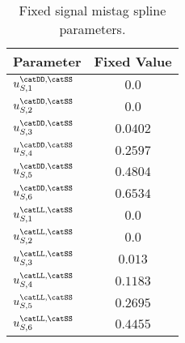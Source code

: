 \begin{table}[htb]
\caption{Fixed signal \SSpi mistag spline parameters.}
\label{tab:app:measurement_of_sin2beta:cpv_measurement:fixed_parameters:eta:sig:ss}
\centering
\begin{tabular}{lr@{$\,\pm\,$}l}
  \toprule
  Parameter                      & \multicolumn{2}{c}{Fixed Value} \\
  \midrule
  $u_{S,1}^\text{\catDD,\catSS}$ & \multicolumn{2}{c}{$0.0$}\\
  $u_{S,2}^\text{\catDD,\catSS}$ & \multicolumn{2}{c}{$0.0$}\\
  $u_{S,3}^\text{\catDD,\catSS}$ & \multicolumn{2}{c}{$0.0402$}\\
  $u_{S,4}^\text{\catDD,\catSS}$ & \multicolumn{2}{c}{$0.2597$}\\
  $u_{S,5}^\text{\catDD,\catSS}$ & \multicolumn{2}{c}{$0.4804$}\\
  $u_{S,6}^\text{\catDD,\catSS}$ & \multicolumn{2}{c}{$0.6534$}\\
  $u_{S,1}^\text{\catLL,\catSS}$ & \multicolumn{2}{c}{$0.0$}\\
  $u_{S,2}^\text{\catLL,\catSS}$ & \multicolumn{2}{c}{$0.0$}\\
  $u_{S,3}^\text{\catLL,\catSS}$ & \multicolumn{2}{c}{$0.013$}\\
  $u_{S,4}^\text{\catLL,\catSS}$ & \multicolumn{2}{c}{$0.1183$}\\
  $u_{S,5}^\text{\catLL,\catSS}$ & \multicolumn{2}{c}{$0.2695$}\\
  $u_{S,6}^\text{\catLL,\catSS}$ & \multicolumn{2}{c}{$0.4455$}\\
  \bottomrule
\end{tabular}
\end{table}
%
